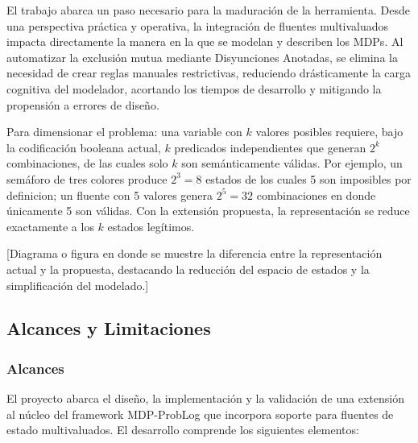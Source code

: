 El trabajo abarca un paso necesario para la maduración de la herramienta. Desde una perspectiva práctica y operativa, la integración de fluentes multivaluados impacta directamente la manera en la que se modelan y describen los MDPs. Al automatizar la exclusión mutua mediante Disyunciones Anotadas, se elimina la necesidad de crear reglas manuales restrictivas, reduciendo drásticamente la carga cognitiva del modelador, acortando los tiempos de desarrollo y mitigando la propensión a errores de diseño. 

Para dimensionar el problema: una variable con $k$ valores posibles requiere, bajo la codificación booleana actual, $k$ predicados independientes que generan $2^k$ combinaciones, de las cuales solo $k$ son semánticamente válidas. Por ejemplo, un semáforo de tres colores produce $2^3 = 8$ estados de los cuales 5 son imposibles por definicion; un fluente con 5 valores genera $2^5 = 32$ combinaciones en donde únicamente 5 son válidas. Con la extensión propuesta, la representación se reduce exactamente a los $k$ estados legítimos.

[Diagrama o figura en donde se muestre la diferencia entre la representación actual y la propuesta, destacando la reducción del espacio de estados y la simplificación del modelado.]

\clearpage

\subsection{Alcances y Limitaciones}
\label{sec:alcances_limitaciones}

\subsubsection{Alcances}
\label{subsec:alcances}

El proyecto abarca el diseño, la implementación y la validación de una
extensión al núcleo del framework MDP-ProbLog que incorpora soporte para
fluentes de estado multivaluados. El desarrollo comprende los siguientes
elementos:


